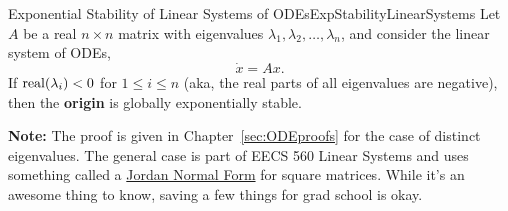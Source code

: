 \bigskip
\begin{center}
\setlength{\fboxrule}{2pt}  %
\end{center}

\bigskip
\begin{propColor}{Exponential Stability of Linear Systems of ODEs}{ExpStabilityLinearSystems}
Let $A$ be a real $n \times n$ matrix with eigenvalues $\lambda_1, \lambda_2, \ldots, \lambda_n$, and consider the linear system of ODEs,
$$\dot{x} = Ax.$$
If ${\rm real}(\lambda_i)< 0$ for $1 \le i \le n$ (aka, the real parts of all eigenvalues are negative), then the \textbf{origin} is globally exponentially stable.  

\bigskip
\textbf{Note:} The proof is given in Chapter~\ref{sec:ODEproofs} for the case of distinct eigenvalues. The general case is part of EECS 560 Linear Systems and uses something called a \href{https://en.wikipedia.org/wiki/Jordan_normal_form}{Jordan Normal Form} for square matrices. While it's an awesome thing to know, saving a few things for grad school is okay.
\end{propColor}

\bigskip

